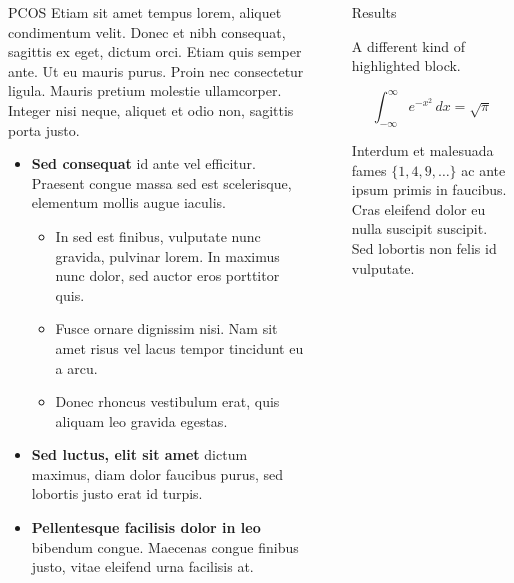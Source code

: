 \documentclass[final]{beamer}
\newlength{\sepwidth}
\newlength{\colwidth}
\newcommand{\separatorcolumn}{\begin{column}{\sepwidth}\end{column}}
\begin{document}
\begin{frame}[t]
\begin{columns}[t]
\begin{column}{\colwidth}
\begin{block}{PCOS}
    Etiam sit amet tempus lorem, aliquet condimentum velit. Donec et nibh
    consequat, sagittis ex eget, dictum orci. Etiam quis semper ante. Ut eu
    mauris purus. Proin nec consectetur ligula. Mauris pretium molestie
    ullamcorper. Integer nisi neque, aliquet et odio non, sagittis porta justo.

    \begin{itemize}
      \item \textbf{Sed consequat} id ante vel efficitur. Praesent congue massa
        sed est scelerisque, elementum mollis augue iaculis.
        \begin{itemize}
          \item In sed est finibus, vulputate
            nunc gravida, pulvinar lorem. In maximus nunc dolor, sed auctor eros
            porttitor quis.
          \item Fusce ornare dignissim nisi. Nam sit amet risus vel lacus
            tempor tincidunt eu a arcu.
          \item Donec rhoncus vestibulum erat, quis aliquam leo
            gravida egestas.
        \end{itemize}
      \item \textbf{Sed luctus, elit sit amet} dictum maximus, diam dolor
        faucibus purus, sed lobortis justo erat id turpis.
      \item \textbf{Pellentesque facilisis dolor in leo} bibendum congue.
        Maecenas congue finibus justo, vitae eleifend urna facilisis at.
    \end{itemize}

  \end{block}

\end{column}

\separatorcolumn

\begin{column}{\colwidth}

  \begin{exampleblock}{Results}

    A different kind of highlighted block.

    $$
    \int_{-\infty}^{\infty} e^{-x^2}\,dx = \sqrt{\pi}
    $$

    Interdum et malesuada fames $\{1, 4, 9, \ldots\}$ ac ante ipsum primis in
    faucibus. Cras eleifend dolor eu nulla suscipit suscipit. Sed lobortis non
    felis id vulputate.



\end{exampleblock}
\end{column}
\end{columns}
\end{frame}
\end{document}

